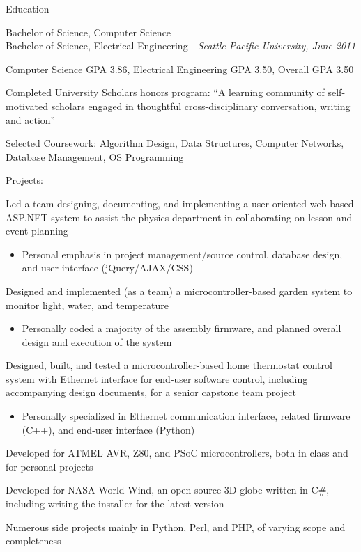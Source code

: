 \documentclass[letterpaper,10pt]{article}
\newenvironment{res_section}[1]{%
  \vskip 6pt
  \noindent
  {\Large \textbf{#1}}\\
  \rule[8pt]{\textwidth}{0.5pt}
  \vskip -8pt
}{
}
\newenvironment{res_subsection}[1]{%
  \vskip 4pt
  \noindent
  \textbf{\large{#1}}
  \begin{itemize}
}{
  \end{itemize}
}
\begin{document}
\begin{res_section}{Education}
\begin{res_subsection}{Bachelor of Science, Computer Science\\
Bachelor of Science, Electrical Engineering - \em{Seattle Pacific University, June 2011}
}
  \item Computer Science GPA 3.86, Electrical Engineering GPA 3.50, Overall GPA 3.50
  \item Completed University Scholars honors program: ``A learning community of self-motivated scholars engaged in thoughtful cross-disciplinary conversation, writing and action''
  \item Selected Coursework: Algorithm Design, Data Structures, Computer Networks, Database Management, OS Programming
\end{res_subsection}
\begin{res_subsection}{Projects:}
  \item Led a team designing, documenting, and implementing a user-oriented web-based ASP.NET system  to assist the physics department in collaborating on lesson and event planning
  \begin{itemize}
    \item Personal emphasis in project management/source control, database design, and user interface (jQuery/AJAX/CSS)
  \end{itemize}
  \item Designed and implemented (as a team) a microcontroller-based garden system to monitor light, water, and temperature
  \begin{itemize}
    \item Personally coded a majority of the assembly firmware, and planned overall design and execution of the system
  \end{itemize}
  \item Designed, built, and tested a microcontroller-based home thermostat control system with Ethernet interface for end-user software control, including accompanying design documents, for a senior capstone team project
  \begin{itemize}
    \item Personally specialized in Ethernet communication interface, related firmware (C++), and end-user interface (Python)
  \end{itemize}
  \item Developed for ATMEL AVR, Z80, and PSoC microcontrollers, both in class and for personal projects
  \item Developed for NASA World Wind, an open-source 3D globe written in C\#, including writing the installer for the latest version
  \item Numerous side projects mainly in Python, Perl, and PHP, of varying scope and completeness
\end{res_subsection}
\end{res_section}
\end{document}

